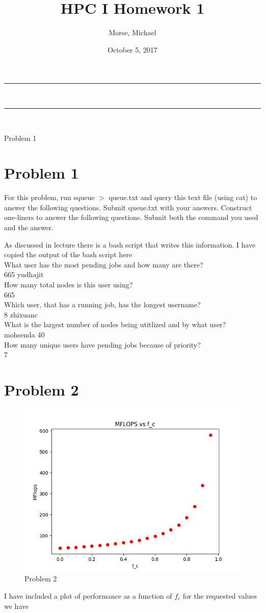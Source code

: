 \documentclass[12pt]{article}
\title{HPC I Homework 1}
\author{Morse, Michael}
\date{October 5, 2017}
\makeatletter
\newcommand{\nline}{\rule{\linewidth}{0.5pt}}
\theoremstyle{plain}
\theoremstyle{definition}
\renewcommand{\maketitle}{
\begin{center}
\nline\\
\vspace{2ex}
{\huge \textsc{\@title}}
\nline\\
{\large\textsc{\@author \hfill \@date}}
\vspace{4ex}
\end{center}
}
\makeatother
\begin{document}
\maketitle

Problem 1

\section*{Problem 1}
For this problem, run squeue $>$ queue.txt and query this text file (using cat) to answer
the following questions. Submit queue.txt with your answers. Construct one-liners to
answer the following questions. Submit both the command you used and the answer.

As discussed in lecture there is a bash script that writes this information. I have copied the output of the bash script here\\
What user has the most pending jobs and how many are there? \\
665 yudhajit\\
How many total nodes is this user using?\\
665\\
Which user, that has a running job, has the longest username?\\
8 zhixuanc\\
What is the largest number of nodes being utitlized and by what user?\\
mohsenda 40\\
How many unique users have pending jobs because of priority?\\
7

\section*{Problem 2}

\begin{figure}
\label{fig:problem2}
\includegraphics[scale=0.7]{problem2.png}
\caption{Problem 2}
\end{figure}
I have included a plot of performance as a function of $f_c$ for the requested values we have
\end{document}
